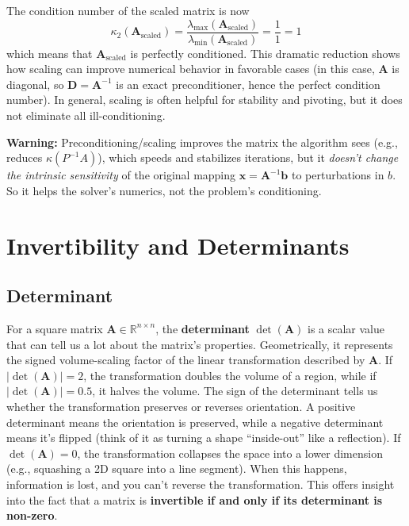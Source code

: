 \begin{exampleBox}
    The condition number of the scaled matrix is now
    \begin{equation*}
        \kappa_2(\mathbf{A}_{\text{scaled}}) = \frac{\lambda_{\text{max}}(\mathbf{A}_{\text{scaled}})}{\lambda_{\text{min}}(\mathbf{A}_{\text{scaled}})} = \frac{1}{1} = 1
    \end{equation*}
    which means that $\mathbf{A}_{\text{scaled}}$ is perfectly conditioned. This dramatic reduction shows how scaling can improve numerical behavior in favorable cases (in this case, $\mathbf{A}$ is diagonal, so $\mathbf{D} = \mathbf{A}^{-1}$ is an exact preconditioner, hence the perfect condition number). In general, scaling is often helpful for stability and pivoting, but it does not eliminate all ill-conditioning.
\end{exampleBox}

\begin{warningBox}
    \textbf{Warning:} Preconditioning/scaling improves the matrix the algorithm sees (e.g., reduces $\kappa(P^{-1}A)$), which speeds and stabilizes iterations, but it \emph{doesn't change the intrinsic sensitivity} of the original mapping $\mathbf{x}=\mathbf{A}^{-1}\mathbf{b}$ to perturbations in $b$. So it helps the solver's numerics, not the problem's conditioning.
\end{warningBox}



\section{Invertibility and Determinants}
\subsection{Determinant}
For a square matrix $ \mathbf{A} \in \mathbb{R}^{n\times n} $, the \textbf{determinant} $ \det(\mathbf{A}) $ is a scalar value that can tell us a lot about the matrix's properties. Geometrically, it represents the signed volume-scaling factor of the linear transformation described by $ \mathbf{A} $. If $ |\det(\mathbf{A})| = 2 $, the transformation doubles the volume of a region, while if $ |\det(\mathbf{A})| = 0.5 $, it halves the volume. The sign of the determinant tells us whether the transformation preserves or reverses orientation. A positive determinant means the orientation is preserved, while a negative determinant means it's flipped (think of it as turning a shape ``inside-out'' like a reflection). If $ \det(\mathbf{A}) = 0 $, the transformation collapses the space into a lower dimension (e.g., squashing a 2D square into a line segment). When this happens, information is lost, and you can't reverse the transformation.
This offers insight into the fact that a matrix is \textbf{invertible if and only if its determinant is non-zero}.


